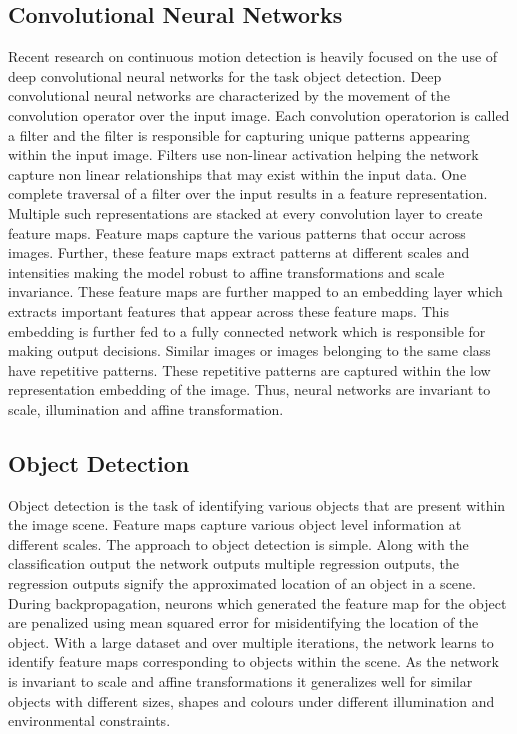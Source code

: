 \documentclass[sigconf]{acmart}
\begin{document}
\subsection{Convolutional Neural Networks}

Recent research on continuous motion detection is heavily focused on the use of deep convolutional neural networks for the task object detection. Deep convolutional neural networks \cite{NIPS20124824} are characterized by the movement of the convolution operator over the input image. Each convolution operatorion is called a filter and the filter is responsible for capturing unique patterns appearing within the input image. Filters use non-linear activation helping the network capture non linear relationships that may exist within the input data. One complete traversal of a filter over the input results in a feature representation. Multiple such representations are stacked at every convolution layer to create feature maps. Feature maps capture the various patterns that occur across images. Further, these feature maps extract patterns at different scales and intensities making the model robust to affine transformations and scale invariance. These feature maps are further mapped to an embedding layer which extracts important features that appear across these feature maps. This embedding is further fed to a fully connected network which is responsible for making output decisions. Similar images or images belonging to the same class have repetitive patterns. These repetitive patterns are captured within the low representation embedding of the image. Thus, neural networks are invariant to scale, illumination and affine transformation.

\subsection{Object Detection}

Object detection is the task of identifying various objects that are present within the image scene. Feature maps capture various object level information at different scales. The approach to object detection is simple. Along with the classification output the network outputs multiple regression outputs, the regression outputs signify the approximated location of an object in a scene. During backpropagation, neurons which generated the feature map for the object are penalized using mean squared error for misidentifying the location of the object. With a large dataset and over multiple iterations, the network learns to identify feature maps corresponding to objects within the scene. As the network is invariant to scale and affine transformations it generalizes well for similar objects with different sizes, shapes and colours under different illumination and environmental constraints.
\end{document}
